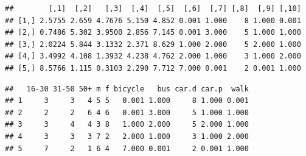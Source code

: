 \begin{Shaded}
\begin{Highlighting}[]
\NormalTok{:}
    \NormalTok{weights3[}\NormalTok{), j] <- all.msim[j, }\NormalTok{]/USd.agg2[j, }
        \NormalTok{]}
    \NormalTok{weights3[}\NormalTok{), j] <- all.msim[j, }\NormalTok{]/USd.agg2[j, }\NormalTok{]}
    \NormalTok{weights3[}\NormalTok{), j] <- all.msim[j, }\NormalTok{]/USd.agg2[j, }\NormalTok{]}
    \NormalTok{weights3[}\NormalTok{), j] <- all.msim[j, }\NormalTok{]/USd.agg2[j, }\NormalTok{]}
    \NormalTok{weights3[}\NormalTok{), j] <- all.msim[j, }\NormalTok{]/USd.agg2[j, }\NormalTok{]}
\NormalTok{\}}
\NormalTok{:}
\NormalTok{\}}
\end{Highlighting}
\end{Shaded}
\begin{verbatim}
##        [,1]  [,2]   [,3]  [,4]  [,5]  [,6]  [,7] [,8]  [,9] [,10]
## [1,] 2.5755 2.659 4.7676 5.150 4.852 0.001 1.000    8 1.000 0.001
## [2,] 0.7486 5.302 3.9500 2.856 7.145 0.001 3.000    5 1.000 1.000
## [3,] 2.0224 5.844 3.1332 2.371 8.629 1.000 2.000    5 2.000 1.000
## [4,] 3.4992 4.108 1.3932 4.238 4.762 2.000 1.000    3 1.000 2.000
## [5,] 8.5766 1.115 0.3103 2.290 7.712 7.000 0.001    2 0.001 1.000
\end{verbatim}
\begin{Shaded}
\begin{Highlighting}[]
\end{Highlighting}
\end{Shaded}
\begin{verbatim}
##   16-30 31-50 50+ m f bicycle   bus car.d car.p  walk
## 1     3     3   4 5 5   0.001 1.000     8 1.000 0.001
## 2     2     2   6 4 6   0.001 3.000     5 1.000 1.000
## 3     3     4   4 3 8   1.000 2.000     5 2.000 1.000
## 4     3     3   3 7 2   2.000 1.000     3 1.000 2.000
## 5     7     2   1 6 4   7.000 0.001     2 0.001 1.000
\end{verbatim}
